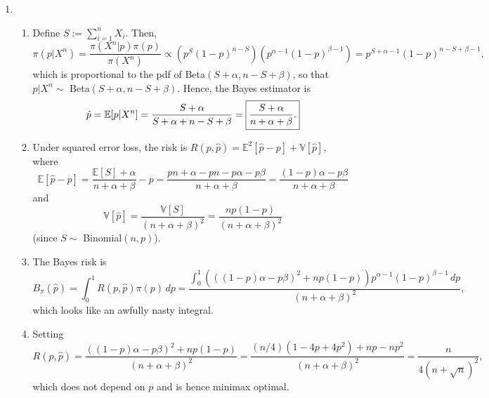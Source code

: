\documentclass[11pt]{article}
\newcommand{\E}{\mathbb{E}} %
\newcommand{\Var}{\mathbb{V}} %
\begin{document}
\begin{enumerate}
\item
\begin{enumerate}
\item Define $S := \sum_{i = 1}^n X_i$. Then,
\[\pi(p | X^n)
    = \frac{\pi(X^n | p) \pi(p)}{\pi(X^n)}
    \propto \left( p^S(1 - p)^{n - S} \right)
            \left( p^{\alpha - 1}(1 - p)^{\beta - 1} \right)
    = p^{S + \alpha - 1}(1 - p)^{n - S + \beta - 1},
\]
which is proportional to the pdf of Beta$(S + \alpha, n - S + \beta)$, so that
$p | X^n \sim$ Beta$(S + \alpha, n - S + \beta)$. Hence, the Bayes estimator is
\[\hat p
    = \E[p | X^n]
    = \frac{S + \alpha}{S + \alpha + n - S + \beta}
    = \mbox{\fbox{$\displaystyle \frac{S + \alpha}{n + \alpha + \beta}$.}}
\]

\item Under squared error loss, the risk is
$R(p,\hat p) = \E^2[\hat p - p] + \Var[\hat p]$, where
\[\E[\hat p - p]
    = \frac{\E[S] + \alpha}{n + \alpha + \beta} - p
    = \frac{pn + \alpha - pn - p\alpha - p\beta}{n + \alpha + \beta}
    = \frac{(1 - p)\alpha - p\beta}{n + \alpha + \beta}
\]
and
\[\Var[\hat p]
    = \frac{\Var[S]}{(n + \alpha + \beta)^2}
    = \frac{np(1 - p)}{(n + \alpha + \beta)^2}
\]
(since $S \sim$ Binomial$(n,p)$).

\item The Bayes risk is
\[B_\pi(\hat p)
    = \int_0^1 R(p,\hat p)\pi(p) \, dp
    = \frac{\int_0^1 (((1 - p)\alpha - p\beta)^2 + np(1 - p))
                                p^{\alpha - 1}(1 - p)^{\beta - 1} \, dp}
           {(n + \alpha + \beta)^2},
\]
which looks like an awfully nasty integral.

\item Setting 
\[R(p,\hat p)
    = \frac{((1 - p)\alpha - p\beta)^2 + np(1 - p)}{(n + \alpha + \beta)^2}
    = \frac{(n/4)(1 - 4p + 4p^2) + np - np^2}{(n + \alpha + \beta)^2}
    = \frac{n}{4(n + \sqrt n)^2},
\]
which does not depend on $p$ and is hence minimax optimal.

\end{enumerate}

\end{enumerate}
\end{document}
